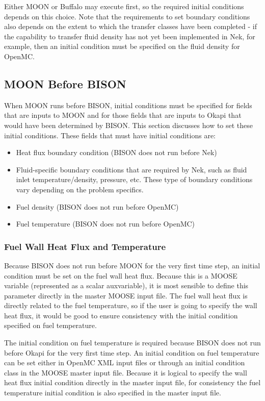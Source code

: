 \documentclass[10pt]{article}
\numberwithin{equation}{section} %
\begin{document}
Either MOON or Buffalo may execute first, so the required initial conditions depends on this choice. Note that the requirements to set boundary conditions also depends on the extent to which the transfer classes have been completed - if the capability to transfer fluid density has not yet been implemented in Nek, for example, then an initial condition must be specified on the fluid density for OpenMC. 

\subsection{MOON Before BISON}
When MOON runs before BISON, initial conditions must be specified for fields that are inputs to MOON and for those fields that are inputs to Okapi that would have been determined by BISON. This section discusses how to set these initial conditions. These fields that must have initial conditions are:

\begin{itemize}
\item Heat flux boundary condition (BISON does not run before Nek)
\item Fluid-specific boundary conditions that are required by Nek, such as fluid inlet temperature/density, pressure, etc. These type of boundary conditions vary depending on the problem specifics.
\item Fuel density (BISON does not run before OpenMC)
\item Fuel temperature (BISON does not run before OpenMC)
\end{itemize}

\subsubsection{Fuel Wall Heat Flux and Temperature}
Because BISON does not run before MOON for the very first time step, an initial condition must be set on the fuel wall heat flux. Because this is a MOOSE variable (represented as a scalar auxvariable), it is most sensible to define this parameter directly in the master MOOSE input file. The fuel wall heat flux is directly related to the fuel temperature, so if the user is going to specify the wall heat flux, it would be good to ensure consistency with the initial condition specified on fuel temperature. 

The initial condition on fuel temperature is required because BISON does not run before Okapi for the very first time step. An initial condition on fuel temperature can be set either in OpenMC XML input files or through an initial condition class in the MOOSE master input file. Because it is logical to specify the wall heat flux initial condition directly in the master input file, for consistency the fuel temperature initial condition is also specified in the master input file. 
\end{document}
